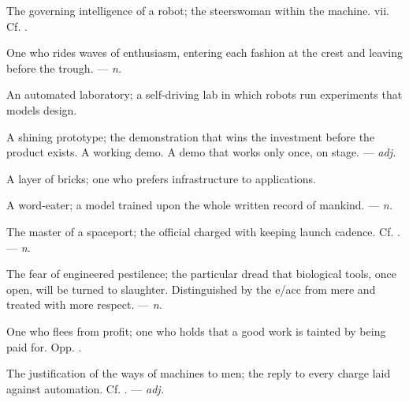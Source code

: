  The governing intelligence of a robot; the steerswoman within the machine.   vii. Cf. .

 One who rides waves of enthusiasm, entering each fashion at the crest and leaving before the trough. ---  \textit{n.}

 An automated laboratory; a self-driving lab in which robots run experiments that models design.  

 A shining prototype; the demonstration that wins the investment before the product exists.  A working demo.   A demo that works only once, on stage. ---  \textit{adj.}

 A layer of bricks; one who prefers infrastructure to applications. 

 A word-eater; a model trained upon the whole written record of mankind.   ---  \textit{n.}

 The master of a spaceport; the official charged with keeping launch cadence. Cf. . ---  \textit{n.}

 The fear of engineered pestilence; the particular dread that biological tools, once open, will be turned to slaughter. Distinguished by the e/acc from mere  and treated with more respect. ---  \textit{n.}

 One who flees from profit; one who holds that a good work is tainted by being paid for. Opp. .

 The justification of the ways of machines to men; the reply to every charge laid against automation. Cf. . ---  \textit{adj.}

